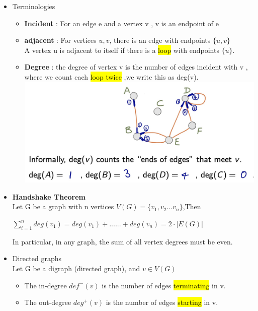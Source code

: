 \documentclass{article}
\begin{document}
\begin{itemize}
================================================================================================================
\newpage
================================================================================================================\\


\item Terminologies
\begin{itemize}
\item \textbf{Incident} : For an edge e and a vertex v ,  v is an endpoint of e
\item \textbf{adjacent} : For vertices $u,v$,  there is an edge with endpoints  $\{u,v\}$\\
A vertex u is adjacent to itself if there is a \hl{loop} with endpoints $\{u\}$.
\item \textbf{Degree}  : the degree of vertex v is the number of edges incident with v , where we count each \hl{loop twice} ,we write this as deg(v).\\
\includegraphics[width=1\linewidth]{graph/25.jpg} \\%
\end{itemize}

\item \textbf{Handshake Theorem}\\
Let G be a graph with n vertices $V(G) = \{v_1,v_2...v_n\}$,Then 
\begin{center}
$\sum_{i=1}^n deg(v_1)  = deg(v_1) + ......  + deg(v_n) = 2 \cdot |E(G)|$
\end{center}
In particular, in any graph, the sum of all vertex degrees must be even.


\item Directed graphs\\
Let G be a digraph (directed graph), and $v \in V(G)$
\begin{itemize}
\item The in-degree $def^{-} (v)$ is the number of edges \hl{terminating} in v.
\item The out-degree $deg^{+} (v)$ is the number of edges \hl{starting} in v. 
\end{itemize}


\end{itemize}
\end{document}

